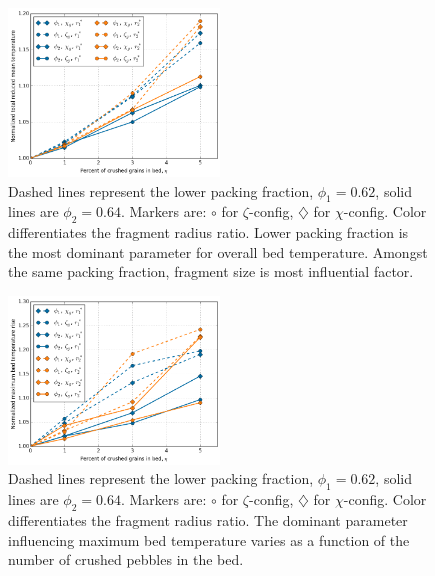 \begin{figure}[!t]
    \centering
    \includegraphics[width = 0.5\textwidth]{figures/eta-theta.png}
    \caption{Dashed lines represent the lower packing fraction, $\phi_1 = 0.62$, solid lines are $\phi_2 = 0.64$. Markers are: $\circ$ for $\zeta$-config, $\diamondsuit$ for $\chi$-config. Color differentiates the fragment radius ratio. Lower packing fraction is the most dominant parameter for overall bed temperature. Amongst the same packing fraction, fragment size is most influential factor.}\label{fig:eta-theta}
\end{figure}

\begin{figure}[!t]
    \centering
    \includegraphics[width = 0.5\textwidth]{figures/eta-T_max.png}
    \caption{Dashed lines represent the lower packing fraction, $\phi_1 = 0.62$, solid lines are $\phi_2 = 0.64$. Markers are: $\circ$ for $\zeta$-config, $\diamondsuit$ for $\chi$-config. Color differentiates the fragment radius ratio. The dominant parameter influencing maximum bed temperature varies as a function of the number of crushed pebbles in the bed.}\label{fig:eta-T_max}
\end{figure}

